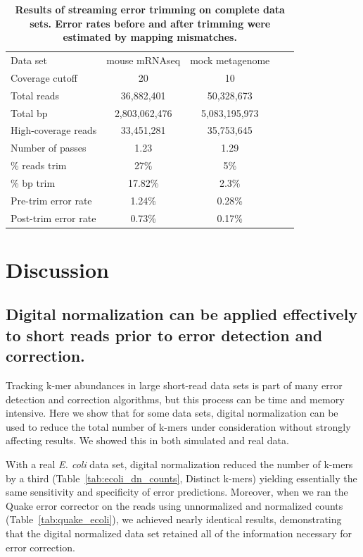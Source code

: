 \documentclass{article}
\begin{document}
\begin{table}
\begin{tabular}{|l|c|c|c|c|}
\hline

Data set             & mouse mRNAseq      & mock metagenome \\
Coverage cutoff      & 20                 & 10 \\
\hline
Total reads          & 36,882,401         & 50,328,673 \\
Total bp             & 2,803,062,476      & 5,083,195,973 \\
High-coverage reads  & 33,451,281         & 35,753,645 \\
Number of passes     & 1.23               & 1.29 \\
\% reads trim        & 27\%               & 5\% \\
\% bp trim           & 17.82\%            & 2.3\% \\
Pre-trim error rate  & 1.24\%             & 0.28\% \\
Post-trim error rate & 0.73\%             & 0.17\% \\
\hline
\end{tabular}

\caption{{\bf Results of streaming error trimming on complete data sets.
Error rates before and after trimming were estimated by mapping mismatches.}}
\label{tab:full_trimming}
\end{table}

\section{Discussion}

\subsection{Digital normalization can be applied effectively to short reads prior to error detection and correction.}

Tracking k-mer abundances in large short-read data sets is part of
many error detection and correction algorithms, but this process can
be time and memory intensive.  Here we show that for some data sets,
digital normalization can be used to reduce the total number of k-mers
under consideration without strongly affecting results.
We showed this in both simulated and real data.

With a real {\em E. coli} data set, digital normalization reduced the
number of k-mers by a third (Table~\ref{tab:ecoli_dn_counts}, Distinct
k-mers) yielding essentially the same sensitivity and specificity of
error predictions.  Moreover, when we ran the Quake error corrector on
the reads using unnormalized and normalized counts
(Table~\ref{tab:quake_ecoli}), we achieved nearly identical results,
demonstrating that the digital normalized data set retained all of the
information necessary for error correction.
\end{document}
